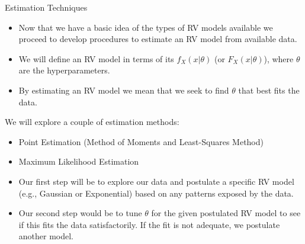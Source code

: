 \documentclass[9pt]{beamer}
\begin{document}
%
\begin{frame}{Estimation Techniques}


\begin{itemize}
\item Now that we have a basic idea of the types of RV models available we proceed to develop procedures to estimate an RV model from available data. 

\item We will  define an RV model in terms of its $f_X(x|\theta)$ (or $F_X(x|\theta)$), where $\theta$ are the hyperparameters. 

\item By estimating an RV model we mean that we seek to find $\theta$ that best fits the data.

\end{itemize}

\begin{block}{}
We will explore a couple of estimation methods:
\begin{itemize}
\item Point Estimation (Method of Moments and Least-Squares Method)

\item Maximum Likelihood Estimation
\end{itemize}
\end{block}

\begin{itemize}
\item Our first step will be to explore our data and postulate a specific RV model (e.g., Gaussian or Exponential) based on any patterns exposed by the data. 
\item Our second step would be to tune $\theta$ for the given postulated RV model to see if this fits the data satisfactorily. If the fit is not adequate, we postulate another model.
\end{itemize}

\end{frame}
\end{document}
